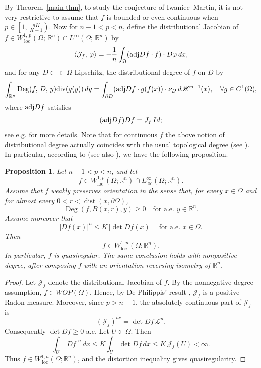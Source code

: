 \documentclass[reqno,11pt]{amsart}
\makeatletter
\def\loc{{\mathop\mathrm{\,loc\,}}}
\newtheorem{prop}[thm]{Proposition}%
\numberwithin{equation}{section}
\theoremstyle{remark}
\makeatother
\begin{document}
By Theorem~\ref{main thm}, to study the conjecture of Iwaniec--Martin, it is not very restrictive to assume that $f$ is bounded or even continuous when $p\in \left[1,\,\frac{nK}{K+1}\right)$. Now for $n-1<p<n$, define the distributional Jacobian of $f\in W^{1,\,p}_{\loc}(\Omega;\,\mathbb R^n)\cap L^\infty(\Omega;\,\mathbb R^n)$ by
$$\langle\mathcal J_f,\,\varphi\rangle=-\frac 1 n\int_{\Omega} ({\rm adj}Df \cdot f) \cdot D\varphi\, dx,$$
and  for any $D\subset\subset \Omega$  Lipschitz, the distributional degree of $f$ on $D$ by
$$\int_{\mathbb R^n} {\rm Deg}(f,\,D,\,y) {\rm div}(g(y))\,dy=\int_{\partial D} ({\rm adj}Df \cdot g(f(x))\cdot \nu_{D}\,d\mathscr H^{n-1}(x), \quad   \forall g\in C^1(\Omega),
$$
where ${\rm adj} Df$ satisfies
$$({\rm adj} Df) Df= J_f \,Id;$$
see e.g. \cite{D2012} for more details. Note that for continuous $f$ the above notion of distributional degree actually coincides with the usual topological degree (see \cite{D2012}). 
In particular, according to \cite[Theorem 1.1 \& Proposition 5.4]{D2012} (see also \cite{M1990, M1993, DG2010}), we have the following proposition.
\begin{prop}\label{positive part}
Let $n-1<p<n$, and let
$$
    f\in W^{1,p}_{\operatorname{loc}}(\Omega;\mathbb R^n)
        \cap L^\infty_{\operatorname{loc}}(\Omega;\mathbb R^n).
$$
Assume that $f$ weakly preserves orientation in the sense that, for every
$x\in\Omega$ and for almost every
$0<r<\operatorname{dist}(x,\partial\Omega)$,
$$
    \operatorname{Deg}(f,B(x,r),y)\ge 0
    \quad\text{for a.e. }y\in\mathbb R^n .
$$
Assume moreover that
$$
    |Df(x)|^n \le K\, |\det Df(x)|
    \quad\text{for a.e. }x\in\Omega .
$$
Then
$$
    f\in W^{1,n}_{\operatorname{loc}}(\Omega;\mathbb R^n).
$$
In particular, $f$ is quasiregular.
The same conclusion holds with nonpositive degree, after composing $f$
with an orientation-reversing isometry of $\mathbb R^n$.
\end{prop} 

\begin{proof}
Let $\mathcal J_f$ denote the distributional Jacobian of $f$. 
By the nonnegative degree assumption, $f\in WOP(\Omega)$. Hence, by
De Philippis' result \cite[Proposition 5.4]{D2012}, $\mathcal J_f$ is a positive Radon measure. Moreover,
since $p>n-1$, the absolutely continuous part of $\mathcal J_f$ is
$$
    (\mathcal J_f)^{ac} = \det Df\,\mathcal L^n .
$$
Consequently $\det Df\ge0$ a.e. Let $U\Subset\Omega$. Then
$$
    \int_U |Df|^n\,dx
    \le K\int_U \det Df\,dx
    \le K\,\mathcal J_f(U)<\infty .
$$
Thus $f\in W^{1,n}_{\loc}(\Omega;\mathbb R^n)$, and the
distortion inequality gives quasiregularity.
\end{proof}
\end{document}
